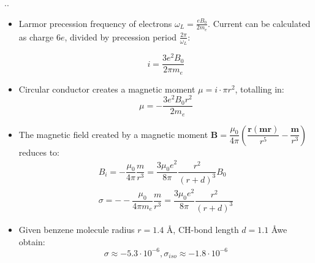 \documentclass{beamer}
\begin{document}
\begin{frame}{\thesection.\thesubsection. \insertsubsection}
\begin{minipage}{0.3\textwidth}
			\end{minipage}
			\hspace{0.1cm}
			{\tiny
			\begin{minipage}{0.65\textwidth}
				\begin{itemize}[<+>]
					\item
									Larmor precession frequency of electrons $\omega_L = \frac{e B_0}{2 m_e}$. Current can be calculated as charge $6 e$, divided by precession period $\frac{2 \pi}{\omega_L}$:
									\par
									\begin{equation}				    
									i = \dfrac{3e^2 B_0}{2 \pi m_e}
									\end{equation}
					\item 
					Circular conductor creates a magnetic moment $\mu = i \cdot \pi r^2 $, totalling in:				
									\begin{equation}
									\mu = -\dfrac{3 e^2 B_0 r^2}{2 m_e}
									\end{equation}
					\item
									The magnetic field created by a magnetic moment  $\bm{B} = \dfrac{\mu_0}{4 \pi}(\dfrac{\bm{r(mr)}}{r^5} - \dfrac{\bm{m}}{r^3}  )$ reduces to:
									\begin{align}
									B_i = -\dfrac{\mu_0}{4 \pi}\dfrac{m}{r^3} = \dfrac{3 \mu_0 e^2}{8 \pi} \dfrac{r^2}{(r+d)^3} B_0 \\
									\sigma = --\dfrac{\mu_0}{4 \pi m_e}\dfrac{m}{r^3} = \dfrac{3 \mu_0 e^2}{8 \pi} \dfrac{r^2}{(r+d)^3}
									\end{align}
					\item
									Given benzene molecule radius $r=1.4$ \AA, CH-bond length $d = 1.1$ \AA we obtain:
									\begin{equation}
									\sigma \approx -5.3 \cdot 10^{-6}, \sigma_{iso} \approx -1.8 \cdot 10^{-6}
									\end{equation}
					
				\end{itemize}

			\end{minipage}
			
		    }%

		
		

\end{frame}
\end{document}
